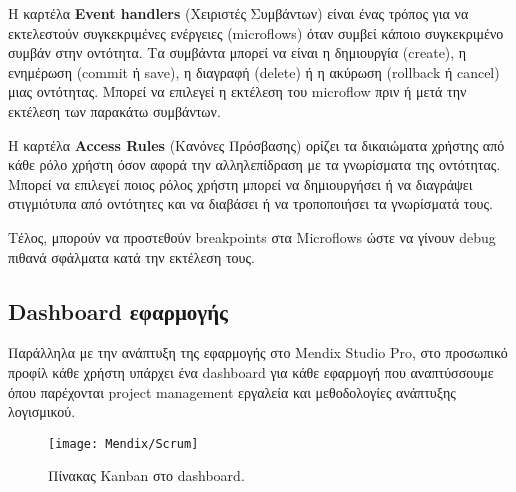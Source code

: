                Η καρτέλα \textbf{Event handlers} (Χειριστές Συμβάντων) είναι ένας τρόπος για να εκτελεστούν συγκεκριμένες ενέργειες (microflows) όταν συμβεί κάποιο συγκεκριμένο συμβάν στην οντότητα. Τα συμβάντα μπορεί να είναι η δημιουργία (create), η ενημέρωση (commit ή save), η διαγραφή (delete) ή η ακύρωση (rollback ή cancel) μιας οντότητας. Μπορεί να επιλεγεί η εκτέλεση του microflow πριν ή μετά την εκτέλεση των παρακάτω συμβάντων.

                Η καρτέλα \textbf{Access Rules} (Κανόνες Πρόσβασης) ορίζει τα δικαιώματα χρήστης από κάθε ρόλο χρήστη όσον αφορά την αλληλεπίδραση με τα γνωρίσματα της οντότητας. Μπορεί να επιλεγεί ποιος ρόλος χρήστη μπορεί να δημιουργήσει ή να διαγράψει στιγμιότυπα από οντότητες και να διαβάσει ή να τροποποιήσει τα γνωρίσματά τους.

                Τέλος, μπορούν να προστεθούν breakpoints στα Microflows ώστε να γίνουν debug πιθανά σφάλματα κατά την εκτέλεση τους.

            \subsection{Dashboard εφαρμογής}
                Παράλληλα με την ανάπτυξη της εφαρμογής στο Mendix Studio Pro, στο προσωπικό προφίλ κάθε χρήστη υπάρχει ένα dashboard για κάθε εφαρμογή που αναπτύσσουμε όπου παρέχονται project management εργαλεία και μεθοδολογίες ανάπτυξης λογισμικού.

                \begin{figure}[h!] \noindent \centering
                        \texttt{[image: Mendix/Scrum]}
                        \caption{\centering Πίνακας Kanban στο dashboard. \cite{mendixDoc}}
                \end{figure}
